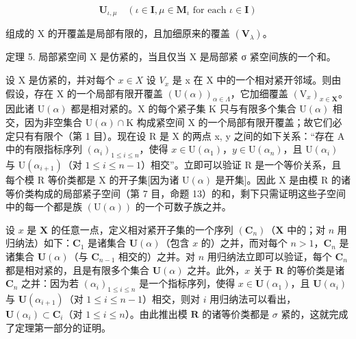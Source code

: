 \[
\mathbf {U} _ {\iota , \mu} \quad (\iota \in \mathbf {I}, \mu \in \mathbf {M} _ {\iota} \text {   for   each   } \iota \in \mathbf {I})
\]

组成的 X 的开覆盖是局部有限的，且加细原来的覆盖 \((\mathbf{V}_{\lambda})\)。

定理 5. 局部紧空间 X 是仿紧的，当且仅当 X 是局部紧 σ 紧空间族的一个和。

设 X 是仿紧的，并对每个 \(x \in X\) 设 \(V_x\) 是 x 在 X 中的一个相对紧开邻域。则由假设，存在 X 的一个局部有限开覆盖 \((\mathrm{U}(\alpha))_{\alpha \in \Lambda}\)，它加细覆盖 \((\mathrm{V}_x)_{x \in \mathbf{X}}\)。因此诸 \(\mathrm{U}(\alpha)\) 都是相对紧的。X 的每个紧子集 K 只与有限多个集合 \(\mathrm{U}(\alpha)\) 相交，因为非空集合 \(\mathrm{U}(\alpha) \cap \mathrm{K}\) 构成紧空间 X 的一个局部有限开覆盖；故它们必定只有有限个（第 1 目）。现在设 R 是 X 的两点 x, y 之间的如下关系：“存在 A 中的有限指标序列 \((\alpha_i)_{1 \leqslant i \leqslant n}\)，使得 \(x \in \mathrm{U}(\alpha_1)\)，\(y \in \mathrm{U}(\alpha_n)\)，且 \(\mathrm{U}(\alpha_i)\) 与 \(\mathrm{U}(\alpha_{i+1})\)（对 \(1 \leqslant i \leqslant n - 1\)）相交”。立即可以验证 R 是一个等价关系，且每个模 R 等价类都是 X 的开子集{[}因为诸 \(\mathrm{U}(\alpha)\) 是开集{]}。因此 X 是由模 R 的诸等价类构成的局部紧子空间（第 7 目，命题 13）的和，剩下只需证明这些子空间中的每一个都是族 \((\mathrm{U}(\alpha))\) 的一个可数子族之并。

设 \(x\) 是 \(\mathbf{X}\) 的任意一点，定义相对紧开子集的一个序列 \((\mathbf{C}_n)\)（\(\mathbf{X}\) 中的；对 \(n\) 用归纳法）如下：\(\mathbf{C}_1\) 是诸集合 \(\mathbf{U}(\alpha)\)（包含 \(x\) 的）之并，而对每个 \(n > 1\)，\(\mathbf{C}_n\) 是诸集合 \(\mathbf{U}(\alpha)\)（与 \(\mathbf{C}_{n-1}\) 相交的）之并。对 \(n\) 用归纳法立即可以验证，每个 \(\mathbf{C}_n\) 都是相对紧的，且是有限多个集合 \(\mathbf{U}(\alpha)\) 之并。此外，\(x\) 关于 \(\mathbf{R}\) 的等价类是诸 \(\mathbf{C}_n\) 之并：因为若 \((\alpha_i)_{1 \leqslant i \leqslant n}\) 是一个指标序列，使得 \(x \in \mathbf{U}(\alpha_1)\)，且 \(\mathbf{U}(\alpha_i)\) 与 \(\mathbf{U}(\alpha_{i+1})\)（对 \(1 \leqslant i \leqslant n - 1\)）相交，则对 \(i\) 用归纳法可以看出，\(\mathbf{U}(\alpha_i) \subset \mathbf{C}_i\)（对 \(1 \leqslant i \leqslant n\)）。由此推出模 \(\mathbf{R}\) 的诸等价类都是 \(\sigma\) 紧的，这就完成了定理第一部分的证明。

